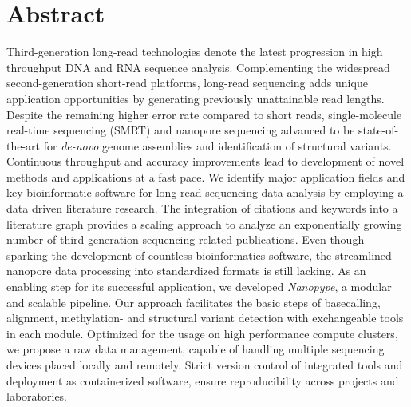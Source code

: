 
\vspace*{2mm}
\section*{Abstract}
\label{sec:abstract}

Third-generation long-read technologies denote the latest progression in high throughput DNA and RNA sequence analysis.
Complementing the widespread second-generation short-read platforms, long-read sequencing adds unique application opportunities by generating previously unattainable read lengths.
Despite the remaining higher error rate compared to short reads, single-molecule real-time sequencing (SMRT) and nanopore sequencing advanced to be state-of-the-art for \textit{de-novo} genome assemblies and identification of structural variants.
Continuous throughput and accuracy improvements lead to development of novel methods and applications at a fast pace.
We identify major application fields and key bioinformatic software for long-read sequencing data analysis by employing a data driven literature research.
The integration of citations and keywords into a literature graph provides a scaling approach to analyze an exponentially growing number of third-generation sequencing related publications.
Even though sparking the development of countless bioinformatics software, the streamlined nanopore data processing into standardized formats is still lacking.
As an enabling step for its successful application, we developed \textit{Nanopype}, a modular and scalable pipeline. 
Our approach facilitates the basic steps of basecalling, alignment, methylation- and structural variant detection with exchangeable tools in each module.
Optimized for the usage on high performance compute clusters, we propose a raw data management, capable of handling multiple sequencing devices placed locally and remotely.
Strict version control of integrated tools and deployment as containerized software, ensure reproducibility across projects and laboratories.
